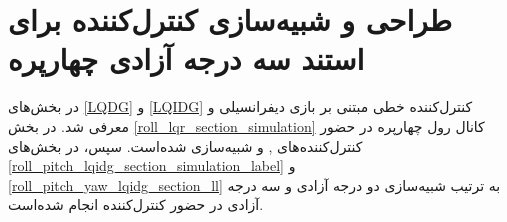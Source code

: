 \chapter{طراحی و شبیه‌سازی کنترل‌کننده برای استند سه درجه آزادی چهارپره}\label{MIL}
در بخش‌های
\ref{LQDG}
و
\ref{LQIDG}
کنترل‌کننده خطی مبتنی بر بازی دیفرانسیلی  و  معرفی شد.
در بخش
\ref{roll_lqr_section_simulation}
کانال 	رول چهارپره در حضور کنترل‌کننده‌های
,
و
شبیه‌سازی شده‌است. سپس، در بخش‌های
\ref{roll_pitch_lqidg_section_simulation_label}
و
\ref{roll_pitch_yaw_lqidg_section_ll}
به‌ ترتیب شبیه‌سازی دو درجه آزادی و سه درجه آزادی در حضور کنترل‌کننده‌  انجام شده‌است.
